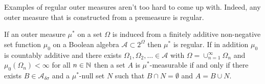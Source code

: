 Examples of regular outer measures aren't too hard to come up with.
Indeed, any outer measure that is constructed from a premeasure is regular.
\begin{prop}\label{InducedOuterMeasuresAreRegular}If an outer measure $\mu^*$ on a set $\Omega$ is induced from a finitely additive non-negative set function $\mu_0$ on a Boolean algebra $\mathcal{A} \subset 2^\Omega$ then $\mu^*$ is regular.  If in addition $\mu_0$ is countably additive and there exists $\Omega_1, \Omega_2, \dotsc \in \mathcal{A}$ with $\Omega = \cup_{n=1}^\infty \Omega_n$ and $\mu_0(\Omega_n) < \infty$ for all $n \in \mathbb{N}$ then a set $A$ is $\mu^*$-measurable if and only if there exists $B \in \mathcal{A}_{\delta \sigma}$ and a $\mu^*$-null set $N$ such that $B \cap N = \emptyset$ and $A = B \cup N$.
\end{prop}
